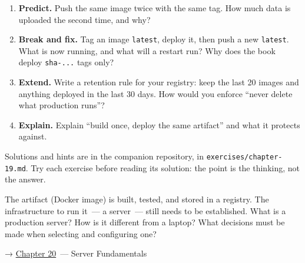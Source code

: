 \begin{enumerate}
\def\labelenumi{\arabic{enumi}.}
\tightlist
\item
  \textbf{Predict.} Push the same image twice with the same tag. How much data is uploaded the second time, and why?
\item
  \textbf{Break and fix.} Tag an image \texttt{latest}, deploy it, then push a new \texttt{latest}. What is now running, and what will a restart run? Why does the book deploy \texttt{sha-...} tags only?
\item
  \textbf{Extend.} Write a retention rule for your registry: keep the last 20 images and anything deployed in the last 30 days. How would you enforce ``never delete what production runs''?
\item
  \textbf{Explain.} Explain ``build once, deploy the same artifact'' and what it protects against.
\end{enumerate}

\noindent{}Solutions and hints are in the companion repository, in \texttt{exercises/}\allowbreak{}\texttt{chapter-19.md}. Try each exercise before reading its solution: the point is the thinking, not the answer.

\label{19-artifact-storage:whats-next}

The artifact (Docker image) is built, tested, and stored in a registry. The infrastructure to run it~--- a server~--- still needs to be established. What is a production server? How is it different from a laptop? What decisions must be made when selecting and configuring one?

\noindent{}→ \hyperref[ch:20-server-fundamentals]{Chapter 20}~--- Server Fundamentals
